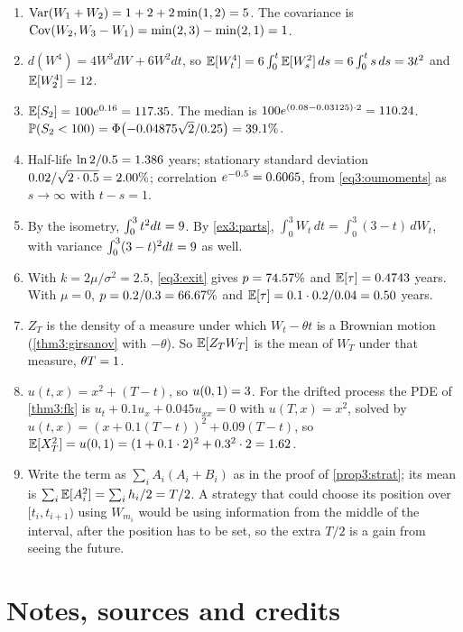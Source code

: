 \begin{chapterrefs}
\begin{enumerate}[label=\textbf{3.\arabic*}, leftmargin=*]
  \item $\operatorname{Var}(W_1+W_2)=1+2+2\min(1,2)=5$. The covariance is
        $\operatorname{Cov}(W_2,W_3-W_1)=\min(2,3)-\min(2,1)=1$.
  \item $d(W^4)=4W^3dW+6W^2dt$, so $\mathbb{E}[W_t^4]=6\int_0^t\mathbb{E}[W_s^2]\,ds=6\int_0^ts\,ds=3t^2$ and
  $\mathbb{E}[W_2^4]=12$.
  \item $\mathbb{E}[S_2]=100e^{0.16}=117.35$. The median is $100e^{(0.08-0.03125)\cdot2}=110.24$.
  $\mathbb P(S_2<100)=\Phi\bigl(-0.04875\sqrt2/0.25\bigr)=39.1\%$.
  \item Half-life $\ln2/0.5=1.386$ years; stationary standard deviation
  $0.02/\sqrt{2\cdot0.5}=2.00\%$; correlation $e^{-0.5}=0.6065$, from \cref{eq3:oumoments} as
  $s\to\infty$ with $t-s=1$.
  \item By the isometry, $\int_0^3t^2dt=9$. By \cref{ex3:parts}, $\int_0^3W_t\,dt=\int_0^3(3-t)\,dW_t$,
  with variance $\int_0^3(3-t)^2dt=9$ as well.
  \item With $k=2\mu/\sigma^2=2.5$, \cref{eq3:exit} gives $p=74.57\%$ and $\mathbb{E}[\tau]=0.4743$ years. With $\mu=0$, $p=0.2/0.3=66.67\%$ and $\mathbb{E}[\tau]=0.1\cdot0.2/0.04=0.50$ years.
  \item $Z_T$ is the density of a measure under which $W_t-\theta t$ is a Brownian motion (\cref{thm3:girsanov}
  with $-\theta$). So $\mathbb{E}[Z_TW_T]$ is the mean of $W_T$ under that measure, $\theta T=1$.
  \item $u(t,x)=x^2+(T-t)$, so $u(0,1)=3$. For the drifted process the PDE of \cref{thm3:fk}
  is $u_t+0.1u_x+0.045u_{xx}=0$ with $u(T,x)=x^2$, solved by $u(t,x)=(x+0.1(T-t))^2+0.09(T-t)$, so
  $\mathbb{E}[X_T^2]=u(0,1)=(1+0.1\cdot2)^2+0.3^2\cdot2=1.62$.
  \item Write the term as $\sum_iA_i(A_i+B_i)$ as in the proof of \cref{prop3:strat}; its mean is
  $\sum_i\mathbb{E}[A_i^2]=\sum_ih_i/2=T/2$. A strategy that could choose its position over $[t_i,t_{i+1})$
  using $W_{m_i}$ would be using information from the middle of the interval, after the position has to
  be set, so the extra $T/2$ is a gain from seeing the future.
\end{enumerate}

\FloatBarrier
\section{Notes, sources and credits}
\label{sec3:credits}


\end{chapterrefs}
